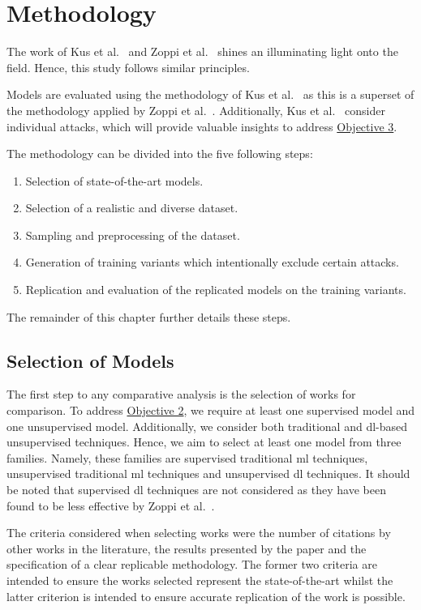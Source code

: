 \chapter{Methodology}%
\label{chp:methodology}

The work of Kus et al.~\cite{Kus} and Zoppi et al.~\cite{Zoppi} shines an
illuminating light onto the field. Hence, this study follows similar
principles.

Models are evaluated using the methodology of Kus et al.~\cite{Kus} as this is
a superset of the methodology applied by Zoppi et al.~\cite{Zoppi}.
Additionally, Kus et al.~\cite{Kus} consider individual attacks, which will
provide valuable insights to address \hyperlink{obj}{Objective 3}.

The methodology can be divided into the five following steps:
\begin{enumerate}
      \item Selection of state-of-the-art models.
      \item Selection of a realistic and diverse dataset.
      \item Sampling and preprocessing of the dataset.
      \item Generation of training variants which intentionally exclude certain attacks.
      \item Replication and evaluation of the replicated models on the training variants.
\end{enumerate}
The remainder of this chapter further details these steps.

\section{Selection of Models}%
\label{sec:models}

The first step to any comparative analysis is the selection of works for
comparison. To address \hyperlink{obj}{Objective 2}, we require at least one
supervised model and one unsupervised model. Additionally, we consider both
traditional and \gls{dl}-based unsupervised techniques. Hence, we aim to select
at least one model from three families. Namely, these families are supervised
traditional \gls{ml} techniques, unsupervised traditional \gls{ml} techniques
and unsupervised \gls{dl} techniques. It should be noted that supervised
\gls{dl} techniques are not considered as they have been found to be less
effective by Zoppi et al.~\cite{Zoppi}.

The criteria considered when selecting works were the number of citations by
other works in the literature, the results presented by the paper and the
specification of a clear replicable methodology. The former two criteria are
intended to ensure the works selected represent the state-of-the-art whilst the
latter criterion is intended to ensure accurate replication of the work is
possible.

